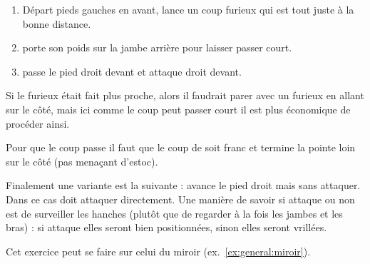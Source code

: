 \begin{exercice}
\begin{enumerate}
	\item Départ pieds gauches en avant, \A lance un coup furieux qui est tout juste à la bonne distance.
	\item \D porte son poids sur la jambe arrière pour laisser passer court.
	\item \D passe le pied droit devant et attaque droit devant.
\end{enumerate}

Si le furieux était fait plus proche, alors il faudrait parer avec un furieux en allant sur le côté, mais ici comme le coup peut passer court il est plus économique de procéder ainsi.

Pour que le coup passe il faut que le coup de \D soit franc et termine la pointe loin sur le côté (pas menaçant d'estoc).

Finalement une variante est la suivante : \A avance le pied droit mais sans attaquer. Dans ce cas \D doit attaquer directement. Une manière de savoir si \A attaque ou non est de surveiller les hanches (plutôt que de regarder à la fois les jambes et les bras) : si \A attaque elles seront bien positionnées, sinon elles seront vrillées.

Cet exercice peut se faire sur celui du miroir (ex.~\ref{ex:general:miroir}).
\end{exercice}

